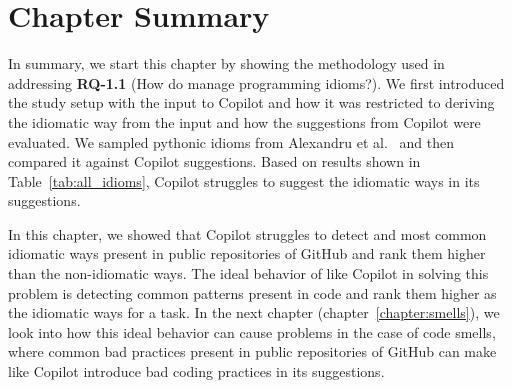 \section{Chapter Summary}
In summary, we start this chapter by showing the methodology used in addressing \textbf{RQ-1.1} (How do \cct{} manage programming idioms?). We first introduced the study setup with the input to Copilot and how it was restricted to deriving the idiomatic way from the input and how the suggestions from Copilot were evaluated. We sampled pythonic idioms from Alexandru et al.~\cite{Alexandru2018} and then compared it against Copilot suggestions. Based on results shown in Table~\ref{tab:all_idioms}, Copilot struggles to suggest the idiomatic ways in its suggestions. 

In this chapter, we showed that Copilot struggles to detect and most common idiomatic ways present in public repositories of GitHub and rank them higher than the non-idiomatic ways. The ideal behavior of \cct{} like Copilot in solving this problem is detecting common patterns present in code and rank them higher as the idiomatic ways for a task.
In the next chapter (chapter~\ref{chapter:smells}), we look into how this ideal behavior can cause problems in the case of code smells, where common bad practices present in public repositories of GitHub can make \cct{} like Copilot introduce bad coding practices in its suggestions.